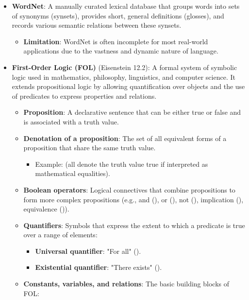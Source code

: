 \documentclass[
]{article}
\providecommand{\tightlist}{%
  \setlength{\itemsep}{0pt}\setlength{\parskip}{0pt}}
\begin{document}
\begin{itemize}
\item
  \textbf{WordNet}: A manually curated lexical database that groups
  words into sets of synonyms (synsets), provides short, general
  definitions (glosses), and records various semantic relations between
  these synsets.

  \begin{itemize}
  \tightlist
  \item
    \textbf{Limitation}: WordNet is often incomplete for most real-world
    applications due to the vastness and dynamic nature of language.
  \end{itemize}
\item
  \textbf{First-Order Logic (FOL)} (Eisenstein 12.2): A formal system of
  symbolic logic used in mathematics, philosophy, linguistics, and
  computer science. It extends propositional logic by allowing
  quantification over objects and the use of predicates to express
  properties and relations.

  \begin{itemize}
  \item
    \textbf{Proposition}: A declarative sentence that can be either true
    or false and is associated with a truth value.
  \item
    \textbf{Denotation of a proposition}: The set of all equivalent
    forms of a proposition that share the same truth value.

    \begin{itemize}
    \tightlist
    \item
      Example: {} (all denote the truth value
      \textquotesingle true\textquotesingle{} if interpreted as
      mathematical equalities).
    \end{itemize}
  \item
    \textbf{Boolean operators}: Logical connectives that combine
    propositions to form more complex propositions (e.g., and ({}), or
    ({}), not ({}), implication ({}), equivalence ({})).
  \item
    \textbf{Quantifiers}: Symbols that express the extent to which a
    predicate is true over a range of elements:

    \begin{itemize}
    \tightlist
    \item
      \textbf{Universal quantifier}: "For all" ({}).
    \item
      \textbf{Existential quantifier}: "There exists" ({}).
    \end{itemize}
  \item
    \textbf{Constants, variables, and relations}: The basic building
    blocks of FOL:


\end{itemize}
\end{itemize}
\end{document}
